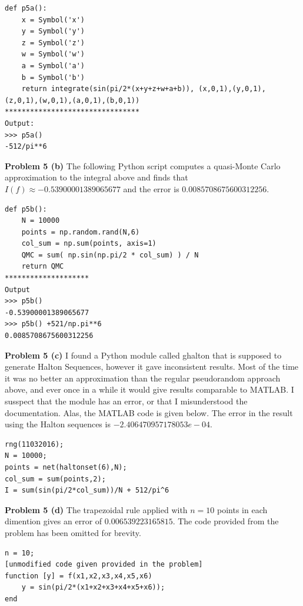\documentclass[12pt]{article}
\newcommand{\problem}[1]{\hspace{-4 ex} \large \textbf{Problem #1} }
\begin{document}
\begin{lstlisting}
def p5a():
	x = Symbol('x')
	y = Symbol('y')
	z = Symbol('z')
	w = Symbol('w')
	a = Symbol('a')
	b = Symbol('b')
	return integrate(sin(pi/2*(x+y+z+w+a+b)), (x,0,1),(y,0,1),
(z,0,1),(w,0,1),(a,0,1),(b,0,1))
********************************
Output:
>>> p5a()
-512/pi**6
\end{lstlisting}


\bigbreak
\problem{5 (b)} The following Python script computes a quasi-Monte Carlo approximation to the integral above and finds that $I(f) \approx -0.53900001389065677$ and the error is $0.0085708675600312256$.

\begin{lstlisting}
def p5b():
	N = 10000
	points = np.random.rand(N,6)
	col_sum = np.sum(points, axis=1)
	QMC = sum( np.sin(np.pi/2 * col_sum) ) / N
	return QMC
********************
Output
>>> p5b()
-0.53900001389065677
>>> p5b() +521/np.pi**6
0.0085708675600312256
\end{lstlisting}

\bigbreak
\problem{5 (c)} I found a Python module called ghalton that is supposed to generate Halton Sequences, however it gave inconsistent results. Most of the time it was no better an approximation than the regular pseudorandom approach above, and ever once in a while it would give results comparable to MATLAB. I susspect that the module has an error, or that I misunderstood the documentation. Alas, the MATLAB code is given below. The error in the result using the Halton sequences is $-2.406470957178053e-04$.

\begin{lstlisting}
rng(11032016);
N = 10000;
points = net(haltonset(6),N);
col_sum = sum(points,2);
I = sum(sin(pi/2*col_sum))/N + 512/pi^6
\end{lstlisting}

\bigbreak
\problem{5 (d)} The trapezoidal rule applied with $n=10$ points in each dimention gives an error of $0.006539223165815$. The code provided from the problem has been omitted for brevity. 

\begin{lstlisting}
n = 10;
[unmodified code given provided in the problem]
function [y] = f(x1,x2,x3,x4,x5,x6)
	y = sin(pi/2*(x1+x2+x3+x4+x5+x6));
end
\end{lstlisting}
\end{document}
